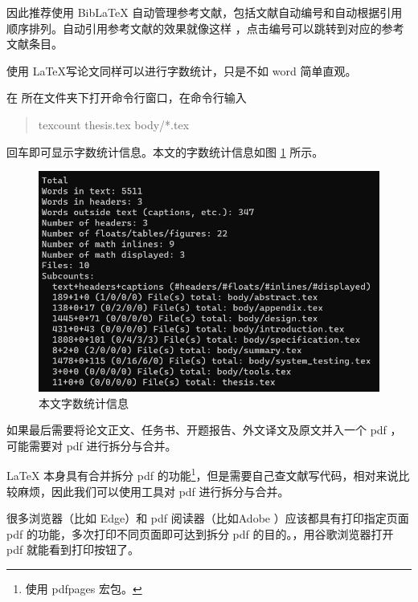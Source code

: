 因此推荐使用 BibLaTeX 自动管理参考文献，包括文献自动编号和自动根据引用顺序排列。自动引用参考文献的效果就像这样 \cite{sample} ，点击编号可以跳转到对应的参考文献条目。


使用 \LaTeX 写论文同样可以进行字数统计，只是不如 word 简单直观。

在  所在文件夹下打开命令行窗口，在命令行输入 

\begin{quote}
texcount thesis.tex body/*.tex
\end{quote}

回车即可显示字数统计信息。本文的字数统计信息如图 \ref{fig:specification:texcount} 所示。

\begin{figure}[htbp]  %
  \centering  %
  \includegraphics[scale=.5]{figure/texcount.png}  %
  \caption{本文字数统计信息}  %
  \label{fig:specification:texcount}  %
\end{figure}

如果最后需要将论文正文、任务书、开题报告、外文译文及原文并入一个 pdf ，可能需要对 pdf 进行拆分与合并。

\LaTeX{} 本身具有合并拆分 pdf 的功能\footnote{使用 pdfpages 宏包。}，但是需要自己查文献写代码，相对来说比较麻烦，因此我们可以使用工具对 pdf 进行拆分与合并。

很多浏览器（比如 Edge）和 pdf 阅读器（比如Adobe ）应该都具有打印指定页面 pdf 的功能，多次打印不同页面即可达到拆分 pdf 的目的。，用谷歌浏览器打开 pdf 就能看到打印按钮了。

